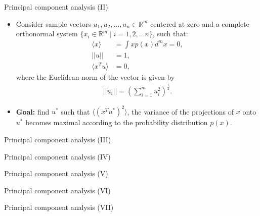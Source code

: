 \documentclass[aspectratio=169,t]{beamer}
\begin{document}
  {
    \begin{frame}{Principal component analysis (II)}
    \begin{itemize}
    \item Consider sample vectors $u_1, u_2, \ldots, u_n \in \mathbb{R}^m$ centered at zero and a complete orthonormal system $\{x_i \in \mathbb{R}^m \; \vert \; i = 1, 2, \ldots n\}$, such that:
    \begin{align}
      \langle x \rangle &= \int x p(x) d^m x = 0,\\
      \vert\vert u \vert\vert &= 1,\\
      \langle x^{T}u \rangle &= 0,
    \end{align}
    where the Euclidean norm of the vector is given by
    \begin{align}
      \vert\vert u_i \vert\vert = \left(\sum_{i=1}^{m} u_i^2\right)^\frac{1}{2}.
    \end{align}
      \item \textbf{Goal:} find $u^*$ such that $\langle (x^{T}u^*)^2 \rangle$, the variance of the projections of $x$ onto $u^*$ becomes maximal according to the probability distribution $p(x)$.
    \end{itemize}
    \end{frame}
  }

  {
    \begin{frame}{Principal component analysis (III)}

    \end{frame}
  }

  {
    \begin{frame}{Principal component analysis (IV)}

    \end{frame}
  }

  {
    \begin{frame}{Principal component analysis (V)}

    \end{frame}
  }

  {
    \begin{frame}{Principal component analysis (VI)}

    \end{frame}
  }

  {
    \begin{frame}{Principal component analysis (VII)}

    \end{frame}
  }
\end{document}
